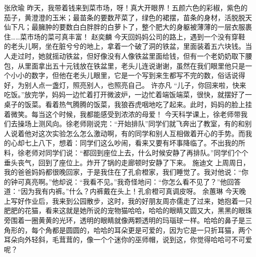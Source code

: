 {}\markdownRendererInterblockSeparator
{}张欣瑜\markdownRendererInterblockSeparator
{}昨天，我带着钱来到菜市场，呀！真大开眼界！五颜六色的彩椒，紫色的茄子，黄澄澄的玉米；最苗条的要数芹菜了，绿色的裙摆，苗条的身材，活脱脱天仙下凡；最臃肿的要数白白胖胖的白萝卜了，整个肥大的身躯被薄薄的一层衣服裹住……菜市场的菜可真丰富！ \markdownRendererInterblockSeparator
{}\markdownRendererInterblockSeparator
{}赵奕麟\markdownRendererInterblockSeparator
{}今天回妈妈公司的路上，遇到一个没有穿鞋的老头儿啊，坐在脏兮兮的地上，拿着一个破了洞的铁盆，里面装着五六块钱。当人走过时，她就摇动铁盆，但好像没有人像铁盆里面给钱，但有一个老奶奶取下腰包，从里面拿出五十元钱放在铁盆里，老头儿连说谢谢，虽然在我们眼里他只是一个小小的数字，但他在老头儿眼里，它是一个写到来生都写不完的数，俗话说得好，为别人点一盏灯，照亮别人，也照亮自己。\markdownRendererInterblockSeparator
{}\markdownRendererInterblockSeparator
{}许亦凡\markdownRendererInterblockSeparator
{}“儿子，你回来啦，快来吃饭。”放完学，妈妈一边忙着打开微波炉，一边忙着端饭端菜，很快，就摆好了一桌子的饭菜。看着热气腾腾的饭菜，我狼吞虎咽地吃了起来。此时，妈妈的脸上挂着微笑。每当这个时候，我都能感受到浓浓的母爱！\markdownRendererInterblockSeparator
{}\markdownRendererInterblockSeparator
{}今天科学课上，徐老师带我们去操场上测风向。徐老师刚说完：“开始排队”同学们就飞奔出了教室，有的和别人说着他对这次实验怎么怎么激动啊，有的同学和别人互相做着开心的手势。而我的心却七上八下，想着：同学们这么吵闹，看来又要有坏事降临了。不出我的所料，徐老师对同学们说：“都回到座位上去，什么时候安静了再排队。”同学们个个垂头丧气，回到了座位上。炸开了锅的走廊顿时安静了下来。\markdownRendererInterblockSeparator
{}\markdownRendererInterblockSeparator
{}施迪文\markdownRendererInterblockSeparator
{}上周周日，我的爸爸妈妈都很晚回家，于是我住在了孔俞橙家，我们睡觉了。我对他说：“你的钟可真亮啊。”他却说：“我看不见。”我奇怪地问：“你怎么看不见了？”他回答道：“因为我有内裤。”什么？内裤戴在头上！孔俞橙可真调皮呀。\markdownRendererInterblockSeparator
{}\markdownRendererInterblockSeparator
{}余蕙琳\markdownRendererInterblockSeparator
{}今天晚上写好作业后，我来到公园散步，这时，我的好朋友周亦儒走了过来，她抱着一只肥肥的花猫，看来这就是她所说的宠物猫哈哈，哈哈的眼睛又圆又大，黑黑的眼珠旁围着一圈黄黄的光环，透明的眼睛就像两颗透明的玛瑙球一样。哈哈的鼻子是三角形的，每个角都是圆圆的，哈哈的耳朵更是可爱的，因为它是一只折耳猫，两个耳朵向外轻斜，毛茸茸的，像一个个迷你的巫师帽，说到这，你觉得哈哈可不可爱呢？\markdownRendererInterblockSeparator
